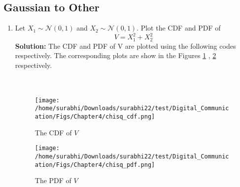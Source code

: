 \documentclass[journal,10pt,twocolumn]{IEEEtran}
\newcounter{Chapcounter}
\numberwithin{equation}{subsection}
\numberwithin{figure}{subsection}
\renewcommand\thesection{\theChapcounter.\arabic{section}}
\newcommand{\solution}{\noindent \textbf{Solution: }}
\providecommand{\gauss}[2]{\mathcal{N}\ensuremath{\left(#1,#2\right)}}
\renewcommand\thesection{\arabic{section}}
\renewcommand\thesubsection{\thesection.\arabic{subsection}}
\begin{document}
\subsection{\textbf{Gaussian to Other}}
\begin{enumerate}[label=\thesubsection.\arabic*,ref=\thesubsection.\arabic{figure}]
\item
Let $X_1 \sim  \gauss{0}{1}$ and $X_2 \sim  \gauss{0}{1}$. Plot the CDF and PDF of
%
\begin{equation}
V = X_1^2 + X_2^2
\end{equation}
\solution 
The CDF and PDF of V are plotted using the following codes respectively. The corresponding plots are show in the Figures \ref{fig:gauss_cdf1} , \ref{fig:gauss_pdf1} respectively.\\

\\	

\\	

\begin{figure}[!ht]
\centering
\texttt{[image: /home/surabhi/Downloads/surabhi22/test/Digital\_Communication/Figs/Chapter4/chisq\_cdf.png]}  
\caption{The CDF of $V$}
\label{fig:gauss_cdf1}
\end{figure}
\begin{figure}[!ht]
\centering
\texttt{[image: /home/surabhi/Downloads/surabhi22/test/Digital\_Communication/Figs/Chapter4/chisq\_pdf.png]}   
\caption{The PDF of $V$}
\label{fig:gauss_pdf1}
\end{figure}


\end{enumerate}
\end{document}
